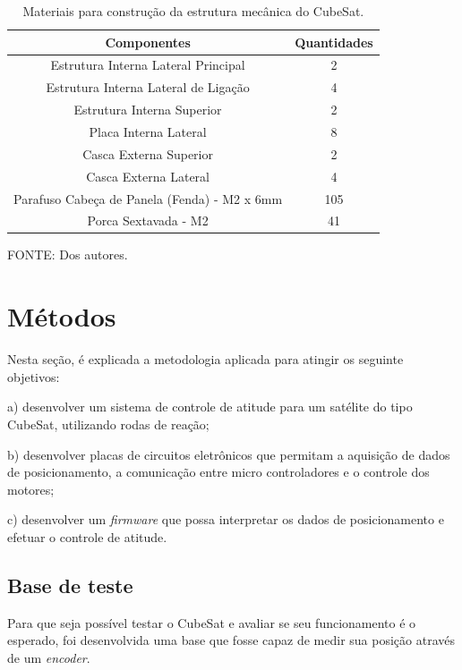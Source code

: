 \documentclass[
	12pt,				%
	openany,			%
	twoside,			%
	a4paper,			%
	english,			%
	french,				%
	spanish,			%
	brazil,				%
	oldfontcommands
	]{abntex2}
\begin{document}
\begin{table}[h]
	\caption{Materiais para construção da estrutura mecânica do CubeSat.}
		\centering
	\begin{tabular}{|c|c|}
		\hline
		\textbf{Componentes} & \textbf{Quantidades} \\ 
		\hline 
		Estrutura Interna Lateral Principal & 2 \\ 
		\hline 
		Estrutura Interna Lateral de Ligação & 4 \\ 
		\hline 
		Estrutura Interna Superior & 2 \\
		\hline 
		Placa Interna Lateral & 8 \\
		\hline 
		Casca Externa Superior & 2 \\ 
		\hline 
		Casca Externa Lateral & 4 \\ 
		\hline 
		Parafuso Cabeça de Panela (Fenda) - M2 x 6mm & 105 \\
		\hline
		Porca Sextavada - M2 & 41 \\
		\hline
	\end{tabular}
	
	\begin{small}
	\vspace{3pt}	
	FONTE: Dos autores.
	\end{small}
	\label{tab:MatMec}
\end{table}

\chapter{Métodos}

Nesta seção, é explicada a metodologia aplicada para atingir os seguinte objetivos:

a)	desenvolver um sistema de controle de atitude para um satélite do tipo CubeSat, utilizando rodas de reação;

b)	desenvolver placas de circuitos eletrônicos que permitam a aquisição de dados de posicionamento, a comunicação entre micro controladores e o controle dos motores;

c)	desenvolver um \textit{firmware} que possa interpretar os dados de posicionamento e efetuar o controle de atitude.

\section{Base de teste}

Para que seja possível testar o CubeSat e avaliar se seu funcionamento é o esperado, foi desenvolvida uma base que fosse capaz de medir sua posição através de um \textit{encoder}.
\end{document}
